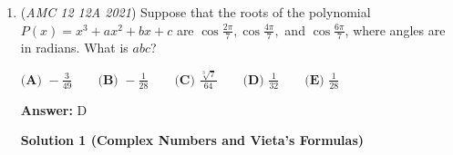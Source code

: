 \begin{enumerate}
 
 \[Y^2=(1-x)(x-\ell).\]

 Substituting $(-1,k\sqrt3)$, we obtain

 
 \[3k^2=2(-1-\ell),\]

 so

 
 \[-1-\ell=\frac{3k^2}{2}.\]

 Similarly, substituting $(-2,k\sqrt2)$ gives

 
 \[2k^2=3(-2-\ell),\]

 and hence

 
 \[-2-\ell=\frac{2k^2}{3}.\]

 Subtracting the second equation from the first,

 
 \[1=\frac{3k^2}{2}-\frac{2k^2}{3}=\frac{5k^2}{6}.\]

 Therefore,

 
 \[\boxed{k^2=\frac65}.\]

 Let $a$ and $b$ be the horizontal and vertical semiaxes of the original ellipse, respectively. Since scaling the vertical coordinate by $k$ transforms the ellipse into a circle,

 
 \[kb=a.\]

 Consequently,

 
 \[\frac{b^2}{a^2}=\frac1{k^2}=\frac56.\]

 Since $k>1$, the horizontal semiaxis is the semimajor axis. The eccentricity of the ellipse is therefore

 
 \[e=\sqrt{1-\frac{b^2}{a^2}}.\]

 Thus,

 
 \[e=\sqrt{1-\frac56}=\sqrt{\frac16}.\]

 We obtain $m=1$ and $n=6$, so

 
 \[\boxed{m+n=7}.\]

 The answer is $\boxed{\text{(A)}}$.

 


	\item (\textit{AMC 12 12A 2021}) Suppose that the roots of the polynomial $P(x)=x^3+ax^2+bx+c$ are $\cos \frac{2\pi}7,\cos \frac{4\pi}7,$ and $\cos \frac{6\pi}7$, where angles are in radians. What is $abc$?


 $\textbf{(A) }{-}\frac{3}{49} \qquad \textbf{(B) }{-}\frac{1}{28} \qquad \textbf{(C) }\frac{\sqrt[3]7}{64} \qquad \textbf{(D) }\frac{1}{32}\qquad \textbf{(E) }\frac{1}{28}$

 \textbf{Answer: }D



\textbf{Solution 1 (Complex Numbers and Vieta's Formulas)}


\end{enumerate}
